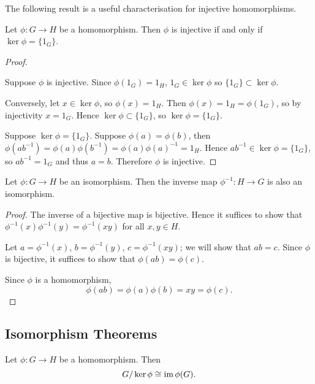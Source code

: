 The following result is a useful characterisation for injective homomorphisms.

\begin{lemma}
Let $\phi:G\to H$ be a homomorphism. Then $\phi$ is injective if and only if $\ker\phi=\{1_G\}$.
\end{lemma}

\begin{proof} \

\fbox{$\implies$} Suppose $\phi$ is injective. Since $\phi(1_G)=1_H$, $1_G\in\ker\phi$ so $\{1_G\}\subset\ker\phi$. 

Conversely, let $x\in\ker\phi$, so $\phi(x)=1_H$. Then $\phi(x)=1_H=\phi(1_G)$, so by injectivity $x=1_G$. Hence $\ker\phi\subset\{1_G\}$, so $\ker\phi=\{1_G\}$.

\fbox{$\impliedby$} Suppose $\ker\phi=\{1_G\}$. Suppose $\phi(a)=\phi(b)$, then $\phi(ab^{-1})=\phi(a)\phi(b^{-1})=\phi(a)\phi(a)^{-1}=1_H$. Hence $ab^{-1}\in\ker\phi=\{1_G\}$, so $ab^{-1}=1_G$ and thus $a=b$. Therefore $\phi$ is injective.
\end{proof}

\begin{lemma}
Let $\phi:G\to H$ be an isomorphism. Then the inverse map $\phi^{-1}:H\to G$ is also an isomorphism.
\end{lemma}

\begin{proof}
The inverse of a bijective map is bijective. Hence it suffices to show that $\phi^{-1}(x)\phi^{-1}(y)=\phi^{-1}(xy)$ for all $x,y\in H$.

Let $a=\phi^{-1}(x)$, $b=\phi^{-1}(y)$, $c=\phi^{-1}(xy)$; we will show that $ab=c$. Since $\phi$ is bijective, it suffices to show that $\phi(ab)=\phi(c)$.

Since $\phi$ is a homomorphism,
\[\phi(ab)=\phi(a)\phi(b)=xy=\phi(c).\]
\end{proof}

\subsection{Isomorphism Theorems}
\begin{theorem}
Let $\phi:G\to H$ be a homomorphism. Then
\[G/\ker\phi\cong\operatorname{im}\phi(G).\]
\end{theorem}

